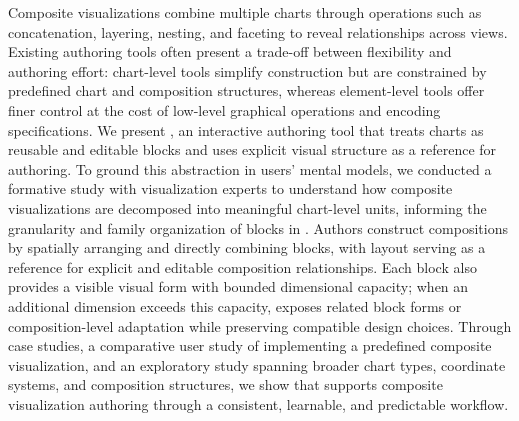 Composite visualizations combine multiple charts through operations such as
concatenation, layering, nesting, and faceting to reveal relationships across
views. Existing authoring tools often present a trade-off between flexibility
and authoring effort: chart-level tools simplify construction but are
constrained by predefined chart and composition structures, whereas
element-level tools offer finer control at the cost of low-level graphical
operations and encoding specifications. We present {\system}, an interactive
authoring tool that treats charts as reusable and editable blocks and uses
explicit visual structure as a reference for authoring. To ground this
abstraction in users' mental models, we conducted a formative study with
visualization experts to understand how composite visualizations are
decomposed into meaningful chart-level units, informing the granularity and
family organization of blocks in {\system}. Authors construct compositions by
spatially arranging and directly combining blocks, with layout serving as a
reference for explicit and editable composition relationships. Each block also
provides a visible visual form with bounded dimensional capacity; when an
additional dimension exceeds this capacity, {\system} exposes related block
forms or composition-level adaptation while preserving compatible design
choices. Through case studies, a comparative user study of implementing a
predefined composite visualization, and an exploratory study spanning broader
chart types, coordinate systems, and composition structures, we show that
{\system} supports composite visualization authoring through a consistent,
learnable, and predictable workflow.
